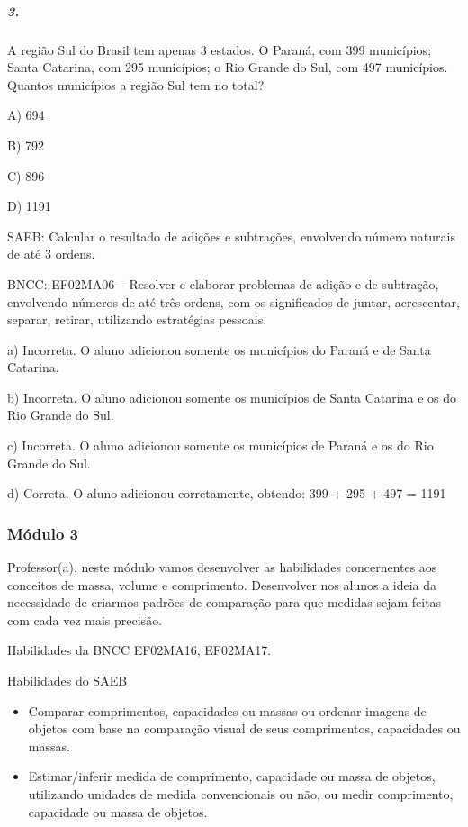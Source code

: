 \subparagraph{3. }\label{section-27}

A região Sul do Brasil tem apenas 3 estados. O Paraná, com 399
municípios; Santa Catarina, com 295 municípios; o Rio Grande do Sul, com
497 municípios. Quantos municípios a região Sul tem no total?

A) 694

B) 792

C) 896

D) 1191

SAEB: Calcular o resultado de adições e subtrações, envolvendo número naturais de até 3 ordens.

BNCC: EF02MA06 -- Resolver e elaborar problemas de adição e de subtração,
envolvendo números de até três ordens, com os significados de juntar, acrescentar, separar,
retirar, utilizando estratégias pessoais.

a) Incorreta. O aluno adicionou somente os municípios do Paraná e de Santa
Catarina.

b) Incorreta. O aluno adicionou somente os municípios de Santa Catarina
e os do Rio Grande do Sul.

c) Incorreta. O aluno adicionou somente os municípios de Paraná e os do Rio
Grande do Sul.

d) Correta. O aluno adicionou corretamente, obtendo: 399 + 295 + 497 = 1191

\subsubsection{Módulo 3 }\label{muxf3dulo-3}

Professor(a), neste módulo vamos desenvolver as habilidades concernentes
aos conceitos de massa, volume e comprimento. Desenvolver nos alunos a
ideia da necessidade de criarmos padrões de comparação para que medidas
sejam feitas com cada vez mais precisão. 

Habilidades da BNCC EF02MA16, EF02MA17.

Habilidades do SAEB

\begin{itemize}
\item
  Comparar comprimentos, capacidades ou massas ou ordenar imagens de
  objetos com base na comparação visual de seus comprimentos, capacidades ou massas.
\end{itemize}

\begin{itemize}
\item
  Estimar/inferir medida de comprimento, capacidade ou massa de objetos,
  utilizando unidades de medida convencionais ou não, ou medir
  comprimento, capacidade ou massa de objetos.
\end{itemize}

